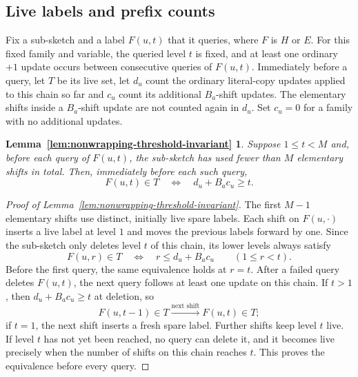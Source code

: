 \theoremstyle{plain}
\newtheorem*{restatedthresholdlemma}{Lemma~\ref{lem:nonwrapping-threshold-invariant}}
\newtheorem*{restatedoneendpointbudgetlemma}{Lemma~\ref{lem:good_label_budget}}
\theoremstyle{definition}

\subsection{Live labels and prefix counts}
\label{app:one-endpoint-threshold-proof}

Fix a sub-sketch and a label $F(u,t)$ that it queries, where $F$ is $H$ or $E$. For this fixed family and variable, the queried level $t$ is fixed, and at least one ordinary $+1$ update occurs between consecutive queries of $F(u,t)$. Immediately before a query, let $T$ be its live set, let $d_u$ count the ordinary literal-copy updates applied to this chain so far and $c_u$ count its additional $B_a$-shift updates. The elementary shifts inside a $B_a$-shift update are not counted again in $d_u$. Set $c_u=0$ for a family with no additional updates.

\begin{restatedthresholdlemma}
Suppose $1\le t<M$ and, before each query of $F(u,t)$, the sub-sketch has used fewer than $M$ elementary shifts in total. Then, immediately before each such query,
\[
F(u,t)\in T
\quad\Longleftrightarrow\quad
d_u+B_a c_u\ge t.
\]
\end{restatedthresholdlemma}

\begin{proof}[Proof of Lemma~\ref{lem:nonwrapping-threshold-invariant}]
The first $M-1$ elementary shifts use distinct, initially live spare labels. Each shift on $F(u,\cdot)$ inserts a live label at level $1$ and moves the previous labels forward by one. Since the sub-sketch only deletes level $t$ of this chain, its lower levels always satisfy
\[
F(u,r)\in T
\quad\Longleftrightarrow\quad
r\le d_u+B_ac_u
\qquad(1\le r<t).
\]
Before the first query, the same equivalence holds at $r=t$. After a failed query deletes $F(u,t)$, the next query follows at least one update on this chain. If $t>1$, then $d_u+B_ac_u\ge t$ at deletion, so
\[
F(u,t-1)\in T
\xrightarrow{\text{next shift}}
F(u,t)\in T;
\]
if $t=1$, the next shift inserts a fresh spare label. Further shifts keep level $t$ live. If level $t$ has not yet been reached, no query can delete it, and it becomes live precisely when the number of shifts on this chain reaches $t$. This proves the equivalence before every query.
\end{proof}

